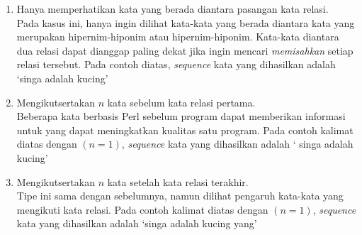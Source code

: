 \begin{enumerate}
  \item Hanya memperhatikan kata yang berada diantara pasangan kata relasi. \\
  Pada kasus ini, hanya ingin dilihat kata-kata yang berada diantara kata yang merupakan hipernim-hiponim atau hipernim-hiponim. Kata-kata diantara dua relasi dapat dianggap paling dekat jika ingin mencari \textit{memisahkan} setiap relasi tersebut. Pada contoh diatas, \textit{sequence} kata yang dihasilkan adalah `{\tagHyponym}singa{\tagHyponym} adalah {\tagHypernym}kucing{\tagHypernym}'
  \item Mengikutsertakan $n$ kata sebelum kata relasi pertama. \\
  Beberapa kata berbasis Perl sebelum program dapat memberikan informasi untuk yang dapat meningkatkan kualitas satu program. Pada contoh kalimat diatas dengan $(n=1)$, \textit{sequence} kata yang dihasilkan adalah `{\tagStart} {\tagHyponym}singa{\tagHyponym} adalah {\tagHypernym}kucing{\tagHypernym}'
  \item Mengikutsertakan $n$ kata setelah kata relasi terakhir. \\
  Tipe ini sama dengan sebelumnya, namun dilihat pengaruh kata-kata yang mengikuti kata relasi. Pada contoh kalimat diatas dengan $(n=1)$, \textit{sequence} kata yang dihasilkan adalah `{\tagHyponym}singa{\tagHyponym} adalah {\tagHypernym}kucing{\tagHypernym} yang'
\end{enumerate}

